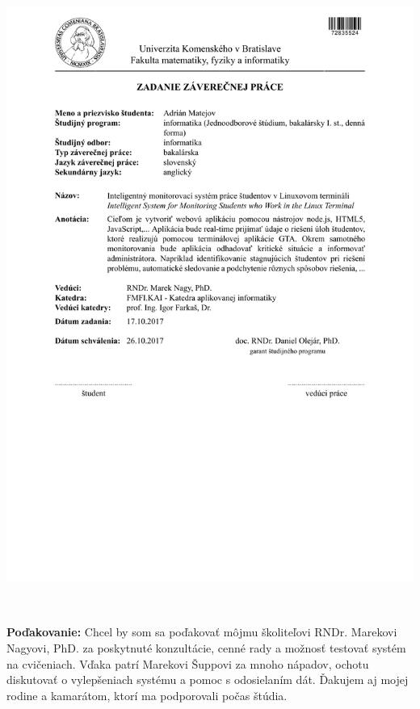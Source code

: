 \documentclass[12pt, oneside]{book}
\theoremstyle{definition}
\begin{document}
\newpage 
\thispagestyle{empty}
\hspace{-2cm}\includegraphics[width=1.1\textwidth]{images/zadanie}


\frontmatter

\setcounter{page}{3}
\newpage 
~

\vfill
{\bf Poďakovanie:} Chcel by som sa poďakovať môjmu školiteľovi
RNDr. Marekovi Nagyovi, PhD. za poskytnuté konzultácie, cenné rady a možnosť
testovať systém na cvičeniach. Vďaka patrí Marekovi Šuppovi za mnoho nápadov, ochotu
diskutovať o vylepšeniach systému a pomoc s odosielaním dát.
Ďakujem aj mojej rodine a kamarátom, ktorí ma podporovali počas štúdia.

\end{document}
